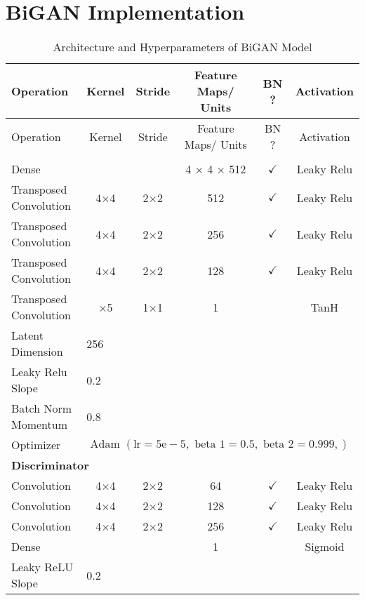 \section{BiGAN Implementation}


\footnotesize
\begin{longtable}[c]{@{}lccccc@{}}
	\caption{Architecture and Hyperparameters of BiGAN Model}
	\label{tab:bigan_imp}\\
	\toprule
	Operation & Kernel & Stride & Feature Maps/ Units & BN ? & Activation \\* \midrule
	\endfirsthead
	\toprule
	Operation & Kernel & Stride & Feature Maps/ Units & BN ? & Activation \\* \midrule
	\endhead
	\bottomrule
	\endfoot
	\endlastfoot
	\multicolumn{6}{l}{\textbf{Generator}} \\
	Dense & \multicolumn{1}{c}{} &  & 4 $\times$ 4 $\times$ 512 & $\checkmark$ & Leaky Relu \\
	Transposed Convolution & \multicolumn{1}{c}{4$\times$4} & 2$\times$2 & 512 & $\checkmark$ & Leaky Relu \\
	Transposed Convolution & \multicolumn{1}{c}{4$\times$4} & 2$\times$2 & 256 & $\checkmark$ & Leaky Relu \\
	Transposed Convolution & \multicolumn{1}{c}{4$\times$4} & 2$\times$2 & 128 & $\checkmark$ & Leaky Relu \\
	Transposed Convolution & \multicolumn{1}{c}{$\times$5} & 1$\times$1 & 1 &  & TanH \\ \hline
	Latent Dimension & \multicolumn{5}{l}{256} \\
	Leaky Relu Slope & \multicolumn{5}{l}{0.2} \\
	Batch Norm Momentum & \multicolumn{5}{l}{0.8} \\
	Optimizer & \multicolumn{5}{l}{$\text { Adam }(\mathrm{lr}=5 \mathrm{e}-5, \text { beta } 1=0.5, \text { beta } 2=0.999,)$} \\ \hline
	\multicolumn{6}{l}{\textbf{Discriminator}} \\
	Convolution & \multicolumn{1}{c}{4$\times$4} & 2$\times$2 & 64 & $\checkmark$ & Leaky Relu \\
	Convolution & \multicolumn{1}{c}{4$\times$4} & 2$\times$2 & 128 & $\checkmark$ & Leaky Relu \\
	Convolution & \multicolumn{1}{c}{4$\times$4} & 2$\times$2 & 256 & $\checkmark$ & Leaky Relu \\
	Dense & \multicolumn{1}{c}{} &  & 1 &  & Sigmoid \\ \hline
	Leaky ReLU Slope & \multicolumn{5}{l}{0.2} \\

\end{longtable}
